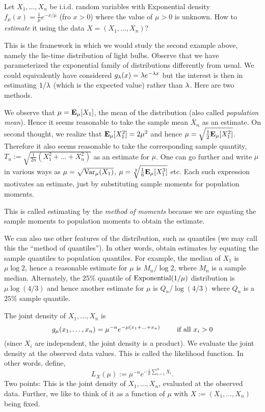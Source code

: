 \documentclass[preprint,  11pt]{amsart}
\begin{document}
 \begin{example}Let $X_{1},\ldots ,X_{n}$ be i.i.d. random variables with Exponential density $f_{\mu}(x)=\frac{1}{\mu}e^{-x/\mu}$ (fro $x>0$) where the value of $\mu>0$ is unknown. How to  {\em estimate} it using the data $X=(X_{1},\ldots ,X_{n})$?


This is the framework in which we would study the second example above, namely the lie-time distribution of light bulbs. Observe that we have parameterized the exponential family of distributions differently from usual. We could equivalently have considered $g_{\lambda}(x)=\lambda e^{-\lambda x}$ but the interest is then in estimating $1/\lambda$ (which is the expected value) rather than $\lambda$. Here are two methods.

 We observe that $\mu=\mathbf{E}_{\mu}[X_{1}]$, the mean of the distribution (also called {\em population mean}). Hence it seems reasonable to take the sample mean $\bar{X}_{n}$ as an estimate. On second thought, we realize that $\mathbf{E}_{\mu}[X_{1}^{2}]=2\mu^{2}$ and hence $\mu=\sqrt{\frac{1}{2}\mathbf{E}_{\mu}[X_{1}^{2}]}$. Therefore it also seems reasonable to take the corresponding sample quantity, $T_{n}:=\sqrt{\frac{1}{2n}(X_{1}^{2}+\ldots +X_{n}^{2})}$ as an estimate for $\mu$. One can go further and write $\mu$ in various ways as $\mu=\sqrt{\mbox{Var}_{\mu}(X_{1})}$, $\mu=\sqrt[3]{\frac{1}{6}\mathbf{E}_{\mu}[X_{1}^{3}]}$ etc. Each such expression motivates an estimate, just by substituting sample moments for population moments.

This is called estimating by the {\em method of moments} because we are equating the sample moments to population moments to obtain the estimate.

We can also use other features of the distribution, such as quantiles (we may call this  the ``method of quantiles''). In other words, obtain estimates by equating the sample quantiles to population quantiles. For example, the median of $X_{1}$ is $\mu\log 2$, hence a reasonable estimate for $\mu$ is $M_{n}/\log 2$, where $M_{n}$ is a sample median. Alternately, the $25\%$ quantile of $\mbox{Exponential}(1/\mu)$ distribution is $\mu\log(4/3)$ and hence another estimate for $\mu$ is $Q_{n}/\log(4/3)$ where $Q_{n}$ is a $25\%$ sample quantile.

 The joint density of $X_{1},\ldots ,X_{n}$ is $$g_{\mu}(x_{1},\ldots ,x_{n})=\mu^{-n}e^{-\mu(x_{1}+\ldots +x_{n})} \qquad \mbox{ if all }x_{i}>0$$ (since $X_{i}$ are independent, the joint density is a product). We evaluate the joint density at the observed data values. This is called the likelihood function. In other words, define,
$$
L_{X}(\mu) := \mu^{-n}e^{-\frac{1}{\mu}\sum_{i=1}^{n}X_{i}}.
$$
Two points: This is the joint density of $X_{1},\ldots ,X_{n}$, evaluated at the observed data. Further, we like to think of it as a function of $\mu$ with $X:=(X_{1},\ldots ,X_{n})$ being fixed.


\end{example}
\end{document}
